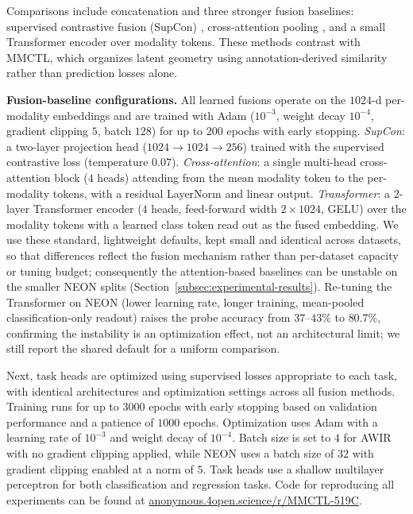 \documentclass[10pt,twocolumn,letterpaper]{article}
\renewcommand{\red}[1]{#1}
\newcommand{\new}[1]{#1}
\begin{document}
\red{Comparisons include concatenation and three stronger fusion baselines: supervised contrastive fusion (SupCon) \cite{khosla2020supervised}, cross-attention pooling \cite{lu2019vilbert}, and a small Transformer encoder \cite{vaswani2017attention} over modality tokens. These methods contrast with MMCTL, which organizes latent geometry using annotation-derived similarity rather than prediction losses alone.}

\new{\noindent\textbf{Fusion-baseline configurations.} All learned fusions operate on the $1024$-d per-modality embeddings and are trained with Adam ($10^{-3}$, weight decay $10^{-4}$, gradient clipping $5$, batch $128$) for up to $200$ epochs with early stopping. \emph{SupCon}: a two-layer projection head ($1024{\to}1024{\to}256$) trained with the supervised contrastive loss (temperature $0.07$). \emph{Cross-attention}: a single multi-head cross-attention block ($4$ heads) attending from the mean modality token to the per-modality tokens, with a residual LayerNorm and linear output. \emph{Transformer}: a $2$-layer Transformer encoder ($4$ heads, feed-forward width $2{\times}1024$, GELU) over the modality tokens with a learned class token read out as the fused embedding. We use these standard, lightweight defaults, kept small and identical across datasets, so that differences reflect the fusion mechanism rather than per-dataset capacity or tuning budget; consequently the attention-based baselines can be unstable on the smaller NEON splits (Section~\ref{subsec:experimental-results}). Re-tuning the Transformer on NEON (lower learning rate, longer training, mean-pooled classification-only readout) raises the probe accuracy from $37$--$43\%$ to $80.7\%$, confirming the instability is an optimization effect, not an architectural limit; we still report the shared default for a uniform comparison.}

Next, task heads are optimized using supervised losses appropriate to each task, with identical architectures and optimization settings across all fusion methods. Training runs for up to $3000$ epochs with early stopping based on validation performance and a patience of $1000$ epochs. Optimization uses Adam with a learning rate of $10^{-3}$ and weight decay of $10^{-4}$. Batch size is set to $4$ for AWIR with no gradient clipping applied, while NEON uses a batch size of $32$ with gradient clipping enabled at a norm of $5$. Task heads use a shallow multilayer perceptron for both classification and regression tasks. Code for reproducing all experiments can be found at
\href{https://anonymous.4open.science/r/MMCTL-519C/}{anonymous.4open.science/r/MMCTL-519C}.
\end{document}
